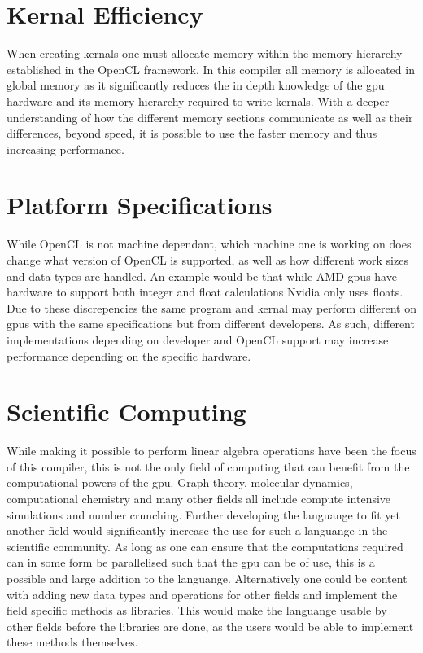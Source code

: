 \section{Kernal Efficiency}
When creating kernals one must allocate memory within the memory hierarchy established in the OpenCL framework.
In this compiler all memory is allocated in global memory as it significantly reduces the in depth knowledge of the \acrshort{gpu} hardware and its memory hierarchy required to write kernals.
With a deeper understanding of how the different memory sections communicate as well as their differences, beyond speed, it is possible to use the faster memory and thus increasing performance.

\section{Platform Specifications}
While OpenCL is not machine dependant, which machine one is working on does change what version of OpenCL is supported, as well as how different work sizes and data types are handled.
An example would be that while AMD \acrshort{gpu}s have hardware to support both integer and float calculations Nvidia only uses floats.
Due to these discrepencies the same program and kernal may perform different on \acrshort{gpu}s with the same specifications but from different developers.
As such, different implementations depending on developer and OpenCL support may increase performance depending on the specific hardware.

\section{Scientific Computing}
While making it possible to perform linear algebra operations have been the focus of this compiler, this is not the only field of computing that can benefit from the computational powers of the \acrshort{gpu}.
Graph theory, molecular dynamics, computational chemistry and many other fields all include compute intensive simulations and number crunching.
Further developing the languange to fit yet another field would significantly increase the use for such a languange in the scientific community.
As long as one can ensure that the computations required can in some form be parallelised such that the \acrshort{gpu} can be of use, this is a possible and large addition to the languange.
Alternatively one could be content with adding new data types and operations for other fields and implement the field specific methods as libraries.
This would make the languange usable by other fields before the libraries are done, as the users would be able to implement these methods themselves.
